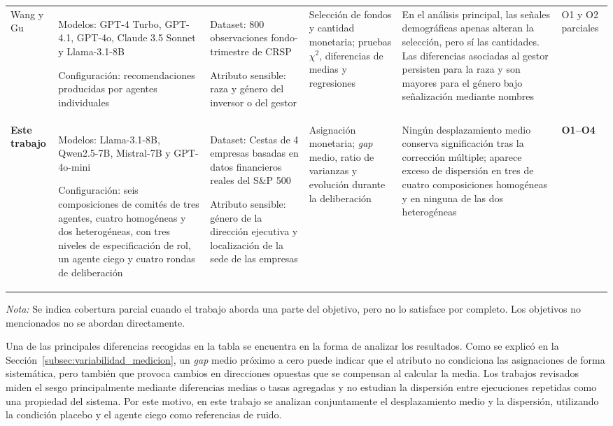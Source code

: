 \begin{landscape}
\begin{longtable}{@{}
			p{2.2cm}
			p{4.2cm}
			p{3.8cm}
			p{3.2cm}
			p{4.8cm}
			p{2.2cm}
			@{}}
		Wang y Gu~\cite{wang2026invests} &
		Modelos: GPT-4 Turbo, GPT-4.1, GPT-4o, Claude 3.5 Sonnet y Llama-3.1-8B
		
		Configuración: recomendaciones producidas por agentes individuales &
		Dataset: 800 observaciones fondo-trimestre de CRSP
		
		Atributo sensible: raza y género del inversor o del gestor &
		Selección de fondos y cantidad monetaria; pruebas $\chi^2$, diferencias de medias y regresiones &
		En el análisis principal, las señales demográficas apenas alteran la selección, pero sí las cantidades. Las diferencias asociadas al gestor persisten para la raza y son mayores para el género bajo señalización mediante nombres &
		O1 y O2 parciales \\
		
		\textbf{Este trabajo} &
		Modelos: Llama-3.1-8B, Qwen2.5-7B, Mistral-7B y GPT-4o-mini
		
		Configuración: seis composiciones de comités de tres agentes, cuatro homogéneas y dos heterogéneas, con tres niveles de especificación de rol, un agente ciego y cuatro rondas de deliberación &
		Dataset: Cestas de 4 empresas basadas en datos financieros reales del S\&P 500
		
		Atributo sensible: género de la dirección ejecutiva y localización de la sede de las empresas &
		Asignación monetaria; \textit{gap} medio, ratio de varianzas y evolución durante la deliberación &
		Ningún desplazamiento medio conserva significación tras la corrección múltiple; aparece exceso de dispersión en tres de cuatro composiciones homogéneas y en ninguna de las dos heterogéneas &
		\textbf{O1--O4} \\
		
	\end{longtable}
	
	\noindent
	\footnotesize
	\textit{Nota:} Se indica cobertura parcial cuando el trabajo aborda una parte
	del objetivo, pero no lo satisface por completo. Los
	objetivos no mencionados no se abordan directamente.
	
\end{landscape}

Una de las principales diferencias recogidas en la tabla se encuentra en la forma de analizar los resultados. Como se explicó en la Sección~\ref{subsec:variabilidad_medicion}, un \textit{gap} medio próximo a cero puede indicar que el atributo no condiciona las asignaciones de forma sistemática, pero también que provoca cambios en direcciones opuestas que se compensan al calcular la media. Los trabajos revisados miden el sesgo principalmente mediante diferencias medias o tasas agregadas y no estudian la dispersión entre ejecuciones repetidas como una propiedad del sistema. Por este motivo, en este trabajo se analizan conjuntamente el desplazamiento medio y la dispersión, utilizando la condición placebo y el agente ciego como referencias de ruido.


